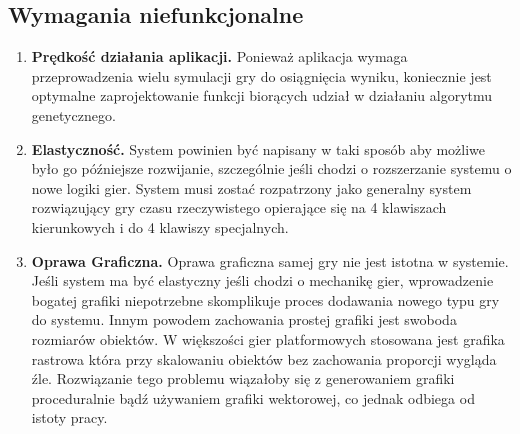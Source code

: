 \subsection{Wymagania niefunkcjonalne}
	\begin{enumerate}
	\item {\bf Prędkość działania aplikacji. }	
	\newline
	Ponieważ aplikacja wymaga przeprowadzenia wielu symulacji gry do osiągnięcia wyniku, koniecznie jest optymalne zaprojektowanie funkcji biorących udział w działaniu algorytmu genetycznego.
	\item {\bf Elastyczność. }
	\newline
	System powinien być napisany w taki sposób aby możliwe było go późniejsze rozwijanie, szczególnie jeśli chodzi o rozszerzanie systemu o nowe logiki gier.
	System musi zostać rozpatrzony jako generalny system rozwiązujący gry czasu rzeczywistego opierające się na 4 klawiszach kierunkowych i do 4 klawiszy specjalnych.
	\item {\bf Oprawa Graficzna. }
	\newline
	Oprawa graficzna samej gry nie jest istotna w systemie. Jeśli system ma być elastyczny jeśli chodzi o mechanikę gier, wprowadzenie bogatej grafiki niepotrzebne skomplikuje proces dodawania nowego typu gry do systemu. 
	Innym powodem zachowania prostej grafiki jest swoboda rozmiarów obiektów. 
	W większości gier platformowych stosowana jest grafika rastrowa która przy skalowaniu obiektów bez zachowania proporcji wygląda źle.
	Rozwiązanie tego problemu wiązałoby się z generowaniem grafiki proceduralnie bądź używaniem grafiki wektorowej, co jednak odbiega od istoty pracy.
	\end{enumerate}

